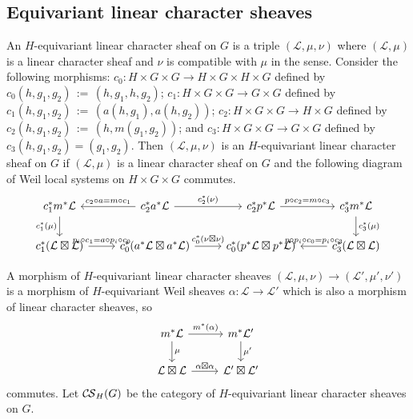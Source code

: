 \documentclass[10pt]{amsart}
\theoremstyle{plain}
\theoremstyle{definition}
\newcommand{\ceq}{{\, :=\, }}
\newcommand{\cs}[1]{{\mathcal{#1}}}
\newcommand{\CS}{{\mathcal{C\hskip-0.8pt S}}}
\begin{document}
\subsection{Equivariant linear character sheaves}

An $H$-equivariant linear character sheaf on $G$ is a triple $(\cs{L},\mu, \nu)$ where $(\cs{L},\mu)$ is a linear character sheaf and $\nu$ is compatible with $\mu$ in the sense. 
Consider the following morphisms: $c_0 : H\times G \times G\to H\times G \times H \times G$ defined by $c_0(h,g_1,g_2)\ceq(h,g_1,h,g_2)$;
$c_1 : H \times G\times G \to G\times G$ defined by $c_1(h, g_1, g_2) \ceq (a(h,g_1),a(h,g_2))$;  $c_2 : H \times G\times G \to H\times G$ defined by $c_2(h,g_1,g_2) \ceq (h, m(g_1,g_2))$; and $c_3 : H \times G\times G \to G\times G$ defined by $c_3(h, g_1, g_2) = (g_1, g_2)$. 
Then $(\cs{L},\mu,\nu)$ is an $H$-equivariant linear character sheaf on $G$ if $(\cs{L},\mu)$ is a linear character sheaf on $G$ and the following diagram of Weil local systems on $H \times G\times G$ commutes.
\[
\begin{tikzcd}
\arrow{d}[swap]{c_1^*(\mu)} c_1^* m^* \cs{L} & \arrow{l}[swap]{c_2\circ a = m\circ c_1}  c_2^* a^* \cs{L} \arrow{r}{c_2^*(\nu)} & c_2^* p^* \cs{L} \arrow{r}{p\circ c_2 = m\circ c_3}  & c_3^* m^*\cs{L} \arrow{d}{c_3^*(\mu)} \\
c_1^*(\cs{L}\boxtimes \cs{L}) \arrow{r}{p_i\circ c_1 = a\circ p_i\circ c_0} & c_0^*(a^*\cs{L}\boxtimes a^*\cs{L}) \arrow{r}{c_0^*(\nu\boxtimes \nu)} & c_0^*(p^*\cs{L} \boxtimes p^*\cs{L}) & \arrow{l}[swap]{p\circ p_i\circ c_0 = p_i \circ c_3}c_3^*(\cs{L}\boxtimes \cs{L})
\end{tikzcd}
\]
\iffalse
On stalks, this condition is
\[
\begin{tikzcd}
\ &  \cs{L}_{h\cdot (xy)} \arrow{r}{} & \cs{L}_{xy} & \\
\cs{L}_{(h\cdot x)(h\cdot y)} \arrow{dr}[swap]{} \arrow[equal]{ur} &&& \arrow[equal]{ul}  \arrow{dl}{} \cs{L}_{xy} \\
& \cs{L}_{h\cdot x}\otimes \cs{L}_{h\cdot y} \arrow{r} & \cs{L}_x\otimes \cs{L}_y & 
\end{tikzcd}
\]
\fi
%
A morphism of $H$-equivariant linear character sheaves $(\cs{L},\mu,\nu) \to (\cs{L}',\mu',\nu')$ is a morphism of $H$-equivariant Weil sheaves $\alpha : \cs{L}\to \cs{L}'$ which is also a morphism of linear character sheaves, so
\[
\begin{tikzcd}
\arrow{d}{\mu} m^*\cs{L} \arrow{r}{m^*(\alpha)} & m^*\cs{L}' \arrow{d}{\mu'} \\
\cs{L}\boxtimes \cs{L} \arrow{r}{\alpha\boxtimes\alpha} & \cs{L}'\boxtimes\cs{L}' 
\end{tikzcd}
\]
commutes.
%
Let $\CS_H(G)$ be the category of $H$-equivariant linear character sheaves on $G$.
\end{document}
